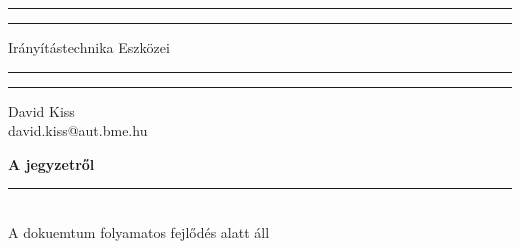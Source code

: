 \documentclass[12pt,hidelinks]{article}
\begin{document}
\begin{titlepage}
	\centering %
	\scshape %
	\vspace*{1.5\baselineskip} %

	\rule{13cm}{1.6pt}\vspace*{-\baselineskip}\vspace*{2pt} %
	\rule{13cm}{0.4pt} %
	
		\vspace{0.75\baselineskip} %
	{	\Huge Irányítástechnika Eszközei\\	}
		\vspace{0.75\baselineskip} %
	\rule{13cm}{0.4pt}\vspace*{-\baselineskip}\vspace{3.2pt} %
	\rule{13cm}{1.6pt} %
	
		\vspace{1.75\baselineskip} %
	{\large David Kiss \\
		\vspace*{1.2\baselineskip}
	david.kiss@aut.bme.hu} \\
	\vfill

\end{titlepage}
\tableofcontents
\vfill
\small{\noindent \textbf{A jegyzetről} \vspace{-3mm}\\
\noindent \rule{3.3cm}{0.5pt} \\
A dokuemtum folyamatos fejlődés alatt áll}
\newpage









\end{document}
